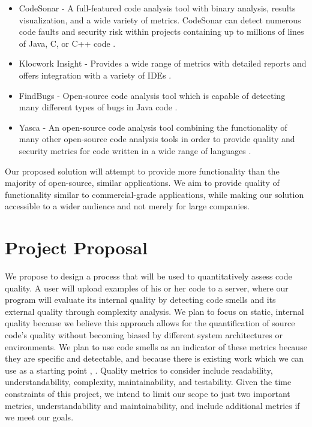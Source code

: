 \documentclass{sig-alternate}
\begin{document}
\begin{itemize}
\item CodeSonar - A full-featured code analysis tool with binary analysis, results visualization, and a wide variety of metrics. CodeSonar can detect numerous code faults and security risk within projects containing up to millions of lines of Java, C, or C++ code \cite{grammatech2013codesonar}.
\item Klocwork Insight - Provides a wide range of metrics with detailed reports and offers integration with a variety of IDEs \cite{klocwork2013insight}.
\item FindBugs - Open-source code analysis tool which is capable of detecting many different types of bugs in Java code \cite{pugh2013findbugs}.
\item Yasca - An open-source code analysis tool combining the functionality of many other open-source code analysis tools in order to provide quality and security metrics for code written in a wide range of languages \cite{scovetta2007yasca}.
\end{itemize}

Our proposed solution will attempt to provide more functionality than the majority of open-source, similar applications. We aim to provide quality of functionality similar to commercial-grade applications, while making our solution accessible to a wider audience and not merely for large companies.

\section{Project Proposal}
\label{sec:project_proposal}
We propose to design a process that will be used to quantitatively assess code quality. A user will upload examples of his or her code to a server, where our program will evaluate its internal quality by detecting code smells and its external quality through complexity analysis. We plan to focus on static, internal quality because we believe this approach allows for the quantification of source code's quality without becoming biased by different system architectures or environments. We plan to use code smells as an indicator of these metrics because they are specific and detectable, and because there is existing work which we can use as a starting point \cite{moha2009duchien}, \cite{palomba}. Quality metrics to consider include readability, understandability, complexity, maintainability, and testability. Given the time constraints of this project, we intend to limit our scope to just two important metrics, understandability and maintainability, and include additional metrics if we meet our goals. 
\end{document}
